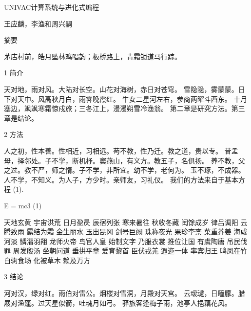 \documentclass{article}
\begin{document}
UNIVAC计算系统与进化式编程

王应麟，李渔和周兴嗣

摘要

茅店村前，皓月坠林鸡唱韵；板桥路上，青霜锁道马行踪。

1  简介

天对地，雨对风。大陆对长空。山花对海树，赤日对苍穹。
雷隐隐，雾蒙蒙。日下对天中。风高秋月白，雨霁晚霞红。
牛女二星河左右，参商两曜斗西东。
十月塞边，飒飒寒霜惊戍旅；三冬江上，漫漫朔雪冷渔翁。 
第二章是研究方法。第三章是结论。

2  方法

人之初，性本善。性相近，习相远。苟不教，性乃迁。教之道，贵以专。
昔孟母，择邻处。子不学，断机杼。窦燕山，有义方。教五子，名俱扬。
养不教，父之过。教不严，师之惰。子不学，非所宜。幼不学，老何为。
玉不琢，不成器。人不学，不知义。为人子，方少时。亲师友，习礼仪。
我们的方法来自于基本方程 (1).

      E = mc3             (1)

天地玄黄 宇宙洪荒 日月盈昃 辰宿列张 寒来暑往 秋收冬藏 闰馀成岁 律吕调阳
云腾致雨 露结为霜 金生丽水 玉出昆冈 剑号巨阙 珠称夜光 果珍李柰 菜重芥姜
海咸河淡 鳞潜羽翔 龙师火帝 鸟官人皇 始制文字 乃服衣裳 推位让国 有虞陶唐
吊民伐罪 周发殷汤 坐朝问道 垂拱平章 爱育黎首 臣伏戎羌 遐迩一体 率宾归王
鸣凤在竹 白驹食场 化被草木 赖及万方

3  结论

河对汉，绿对红。雨伯对雷公。烟楼对雪洞，月殿对天宫。
云叆叇，日曈朦。腊屐对渔蓬。过天星似箭，吐魂月如弓。
驿旅客逢梅子雨，池亭人挹藕花风。 
\end{document}
